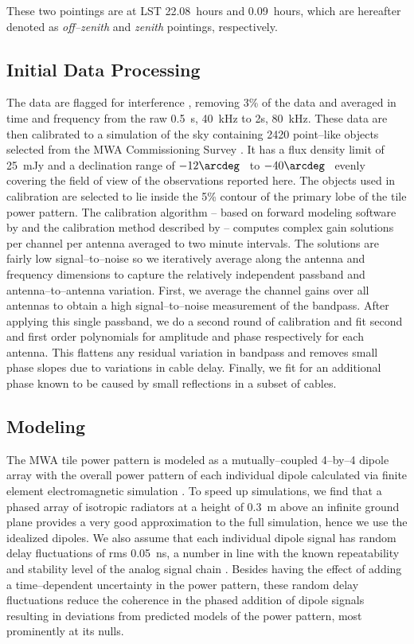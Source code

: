 \documentclass[preprint2,iop,numberedappendix,twocolappendix,appendixfloats]{emulateapj}
\begin{document}
These two pointings are at LST 22.08~hours and 0.09~hours, which are hereafter denoted as {\it off--zenith} and {\it zenith} pointings, respectively. 

\subsection{Initial Data Processing}\label{sec:data-analysis}

The data are flagged for interference \citep{off15}, removing 3\% of the data and averaged in time  and frequency from the raw 0.5~s, 40~kHz to 2s, 80~kHz. These data are then calibrated to a simulation of the sky containing 2420 point--like objects selected from the MWA Commissioning Survey \citep[MWACS;][]{hur14}. It has a flux density limit of 25~mJy and a declination range of $-12\arcdeg$~ to $-40\arcdeg$~ evenly covering the field of view of the observations reported here. The objects used in calibration are selected to lie inside the 5\% contour of the primary lobe of the tile power pattern. The calibration algorithm -- based on forward modeling software by \citet{sul12} and the calibration method described by \citet{sal14} -- computes complex gain solutions per channel per antenna averaged to two minute intervals. The solutions are fairly low signal--to--noise so we iteratively average along the antenna and frequency dimensions to capture the relatively independent passband and antenna--to--antenna variation. First, we average the channel gains over all antennas to obtain a high signal--to--noise measurement of the bandpass. After applying this single passband, we do a second round of calibration and fit second and first order polynomials for amplitude and phase respectively for each antenna. This flattens any residual variation in bandpass and removes small phase slopes due to variations in cable delay. Finally, we fit for an additional phase known to be caused by small reflections in a subset of cables. 

\subsection{Modeling}\label{sec:modeling}

The MWA tile power pattern is modeled as a mutually--coupled 4--by--4 dipole array with the overall power pattern of each individual dipole calculated via finite element electromagnetic simulation \citep{sut14_arXiv}. To speed up simulations, we find that a phased array of isotropic radiators at a height of 0.3~m above an infinite ground plane provides a very good approximation to the full simulation, hence we use the idealized dipoles. We also assume that each individual dipole signal has random delay fluctuations of rms 0.05~ns, a number in line with the known repeatability and stability level of the analog signal chain \citep{bow07b}. Besides having the effect of adding a time--dependent uncertainty in the power pattern, these random delay fluctuations reduce the coherence in the phased addition of dipole signals resulting in deviations from predicted models of the power pattern, most prominently at its nulls. 
\end{document}
